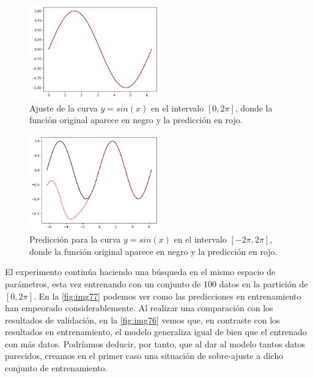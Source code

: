 \begin{figure}[htbp]
    \centering
    \includegraphics[width=0.5\textwidth]{img/img04.png}
    \caption{Ajuste de la curva $y=sin(x)$ en el intervalo $[0,2\pi ]$, donde la función original aparece en negro y la predicción en rojo.}
    \label{fig:img04}
\end{figure}

\begin{figure}[htbp]
    \centering
    \includegraphics[width=0.5\textwidth]{img/img08.png}
    \caption{Predicción para la curva $y=sin(x)$ en el intervalo $[-2\pi,2\pi ]$, donde la función original aparece en negro y la predicción en rojo.}
    \label{fig:img08}
\end{figure}

El experimento continúa haciendo una búsqueda en el mismo espacio de parámetros, esta vez entrenando con un conjunto de 100 datos en la partición de $[0,2\pi]$. En la \autoref{fig:img77} podemos ver como las predicciones en entrenamiento han empeorado considerablemente. Al realizar una comparación con los resultados de validación, en la \autoref{fig:img76} vemos que, en contraste con los resultados en entrenamiento, el modelo generaliza igual de bien que el entrenado con más datos. Podríamos deducir, por tanto, que al dar al modelo tantos datos parecidos, creamos en el primer caso una situación de sobre-ajuste a dicho conjunto de entrenamiento. 

